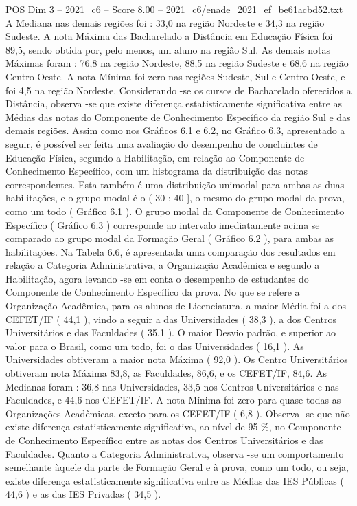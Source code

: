 \begin{textsample}{POS Dim 3 – 2021\_c6 – Score 8.00 – 2021\_c6/enade\_2021\_ef\_be61acbd52.txt}
A Mediana nas demais regiões foi : 33,0 na região Nordeste e 34,3 na região Sudeste.
A nota Máxima das Bacharelado a Distância em Educação Física foi 89,5, sendo obtida por, pelo menos, um aluno na região Sul.
As demais notas Máximas foram : 76,8 na região Nordeste, 88,5 na região Sudeste e 68,6 na região Centro-Oeste.
A nota Mínima foi zero nas regiões Sudeste, Sul e Centro-Oeste, e foi 4,5 na região Nordeste.
Considerando -se os cursos de Bacharelado oferecidos a Distância, observa -se que existe diferença estatisticamente significativa entre as Médias das notas do Componente de Conhecimento Específico da região Sul e das demais regiões.
Assim como nos Gráficos 6.1 e 6.2, no Gráfico 6.3, apresentado a seguir, é possível ser feita uma avaliação do desempenho de concluintes de Educação Física, segundo a Habilitação, em relação ao Componente de Conhecimento Específico, com um histograma da distribuição das notas correspondentes.
Esta também é uma distribuição unimodal para ambas as duas habilitações, e o grupo modal é o ( 30 ; 40 ], o mesmo do grupo modal da prova, como um todo ( Gráfico 6.1 ).
O grupo modal da Componente de Conhecimento Específico ( Gráfico 6.3 ) corresponde ao intervalo imediatamente acima se comparado ao grupo modal da Formação Geral ( Gráfico 6.2 ), para ambas as habilitações.
Na Tabela 6.6, é apresentada uma comparação dos resultados em relação a Categoria Administrativa, a Organização Acadêmica e segundo a Habilitação, agora levando -se em conta o desempenho de estudantes do Componente de Conhecimento Específico da prova.
No que se refere a Organização Acadêmica, para os alunos de Licenciatura, a maior Média foi a dos CEFET/IF ( 44,1 ), vindo a seguir a das Universidades ( 38,3 ), a dos Centros Universitários e das Faculdades ( 35,1 ).
O maior Desvio padrão, e superior ao valor para o Brasil, como um todo, foi o das Universidades ( 16,1 ).
As Universidades obtiveram a maior nota Máxima ( 92,0 ).
Os Centro Universitários obtiveram nota Máxima 83,8, as Faculdades, 86,6, e os CEFET/IF, 84,6.
As Medianas foram : 36,8 nas Universidades, 33,5 nos Centros Universitários e nas Faculdades, e 44,6 nos CEFET/IF.
A nota Mínima foi zero para quase todas as Organizações Acadêmicas, exceto para os CEFET/IF ( 6,8 ).
Observa -se que não existe diferença estatisticamente significativa, ao nível de 95 \%, no Componente de Conhecimento Específico entre as notas dos Centros Universitários e das Faculdades.
Quanto a Categoria Administrativa, observa -se um comportamento semelhante àquele da parte de Formação Geral e à prova, como um todo, ou seja, existe diferença estatisticamente significativa entre as Médias das IES Públicas ( 44,6 ) e as das IES Privadas ( 34,5 ).

\end{textsample}
